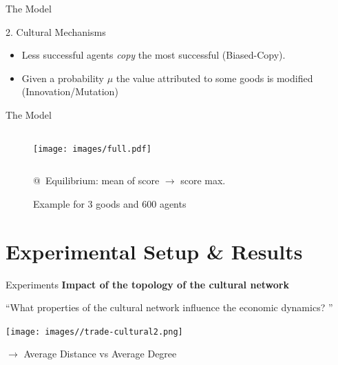 \documentclass[12pt, notes=show]{beamer}
\begin{document}
	\begin{frame}{The Model}
		\begin{block}{2. Cultural Mechanisms}
			\begin{itemize}
					\vfill
				\item Less successful agents \emph{copy} the most successful (Biased-Copy).
					\vfill
				\item Given a probability $\mu$ the value attributed to some goods is modified (Innovation/Mutation)
			\end{itemize}
		\end{block}
	\end{frame}

	\begin{frame}{The Model }
		\begin{figure}
			\caption{Example for 3 goods and 600 agents}
			\begin{columns}
				\texttt{[image: images/full.pdf]} 
			\end{columns}
			@~Equilibrium: mean of score  $\rightarrow$ score max.
		\end{figure}

	\end{frame}

	\section{Experimental Setup \& Results}
	\begin{frame}{Experiments}
		\textbf{Impact of the topology of the cultural network }
		\begin{center}
			``What properties of the cultural network influence the economic dynamics? '' 
		\end{center}
		\begin{center}
			\texttt{[image: images//trade-cultural2.png]}
		\end{center}
		\vfil
		$\rightarrow$ Average Distance vs Average Degree\\




	\end{frame}
\end{document}
